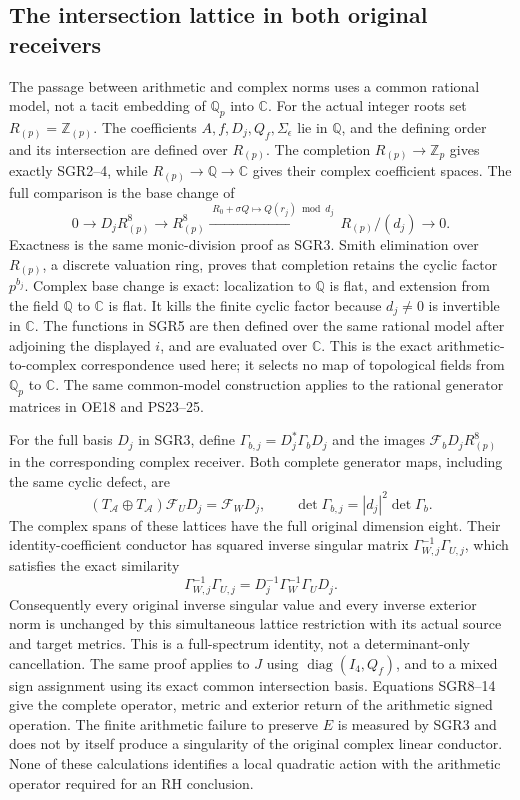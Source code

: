 \subsection{The intersection lattice in both original receivers}
The passage between arithmetic and complex norms uses a common rational
model, not a tacit embedding of $\mathbb Q_p$ into $\mathbb C$.
For the actual integer roots set $R_{(p)}=\mathbb Z_{(p)}$.
The coefficients $A,f,D_j,Q_f,\Sigma_\epsilon$ lie in $\mathbb Q$,
and the defining order and its intersection are defined over $R_{(p)}$.
The completion $R_{(p)}\to\mathbb Z_p$ gives exactly SGR2--4,
while $R_{(p)}\to\mathbb Q\to\mathbb C$ gives their complex
coefficient spaces. The full comparison is the base change of
\[
 0\longrightarrow D_jR_{(p)}^8\longrightarrow R_{(p)}^8
 \xrightarrow{\;R_0+\sigma Q\mapsto Q(r_j)\bmod d_j\;}
 R_{(p)}/(d_j)\longrightarrow0.
 \tag{SGR15}
\]
Exactness is the same monic-division proof as SGR3. Smith elimination
over $R_{(p)}$, a discrete valuation ring, proves that completion
retains the cyclic factor $p^{b_j}$. Complex base change is exact:
localization to $\mathbb Q$ is flat, and extension from the field
$\mathbb Q$ to $\mathbb C$ is flat. It kills the finite cyclic
factor because $d_j\ne0$ is invertible in $\mathbb C$.
The functions in SGR5 are then defined over the same rational model
after adjoining the displayed $i$, and are evaluated over $\mathbb C$.
This is the exact arithmetic-to-complex correspondence used here;
it selects no map of topological fields from $\mathbb Q_p$ to
$\mathbb C$. The same common-model construction applies to the
rational generator matrices in OE18 and PS23--25.

For the full basis $D_j$ in SGR3, define
$\Gamma_{b,j}=D_j^*\Gamma_bD_j$ and the images
$\mathcal F_bD_jR_{(p)}^8$ in the corresponding complex receiver.
Both complete generator maps, including the same cyclic defect, are
\[
 (T_{\mathcal A}\oplus T_{\mathcal A})\mathcal F_UD_j
       =\mathcal F_WD_j,\qquad
 \det\Gamma_{b,j}=|d_j|^2\det\Gamma_b.
 \tag{SGR13}
\]
The complex spans of these lattices have the full original dimension
eight. Their identity-coefficient conductor has squared inverse
singular matrix $\Gamma_{W,j}^{-1}\Gamma_{U,j}$, which satisfies
the exact similarity
\[
 \Gamma_{W,j}^{-1}\Gamma_{U,j}
     =D_j^{-1}\Gamma_W^{-1}\Gamma_UD_j.
 \tag{SGR14}
\]
Consequently every original inverse singular value and every inverse
exterior norm is unchanged by this simultaneous lattice restriction
with its actual source and target metrics. This is a full-spectrum
identity, not a determinant-only cancellation. The same proof applies
to $J$ using $\operatorname{diag}(I_4,Q_f)$, and to a mixed sign
assignment using its exact common intersection basis.
Equations SGR8--14 give the complete operator, metric and exterior
return of the arithmetic signed operation. The finite arithmetic
failure to preserve $E$ is measured by SGR3 and does not by itself
produce a singularity of the original complex linear conductor.
None of these calculations identifies a local quadratic action with
the arithmetic operator required for an RH conclusion.
